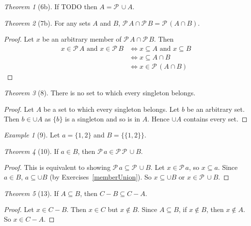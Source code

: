 \documentclass[12pt]{article}
\theoremstyle{plain}
\theoremstyle{remark}
\newtheorem*{exthm}{Theorem}
\newtheorem*{eg}{Example}
\theoremstyle{definition}
\theoremstyle{remark}
\newcommand{\powerset}{\mathscr{P}\,}
\renewcommand{\iff}{\Leftrightarrow}
\begin{document}
\begin{exthm}[6b]
 If TODO then $A = \powerset \cup A$.
\end{exthm}


\begin{exthm}[7b]
 For any sets $A$ and $B$, $\powerset A \cap \powerset B = \powerset (A \cap B)$.
\end{exthm}
\begin{proof}
 Let $x$ be an arbitrary member of $\powerset A \cap \powerset B$. Then
 \begin{align*}
  x \in \powerset A \text{ and } x \in \powerset B &\Leftrightarrow
  x \subseteq A \text { and } x \subseteq B\\
                                                   &\Leftrightarrow x \subseteq A \cap B\\
                                                   &\iff x \in \powerset (A \cap B)
 \end{align*}
\end{proof}

\begin{exthm}[8]
 There is no set to which every singleton belongs.
\end{exthm}
\begin{proof}
 Let $A$ be a set to which every singleton belongs. Let $b$ be an arbitrary set. Then $b \in \cup A$ as $\{b\}$ is a singleton and so is in $A$. Hence $\cup A$ contains every set.
\end{proof}

\begin{eg}[9]
 Let $a = \{1,2\}$ and $B = \{\{1,2\}\}$.
\end{eg}

\begin{exthm}[10]
 If $a \in B$, then $\powerset a \in \powerset \powerset \cup B$.
\end{exthm}

\begin{proof}
 This is equivalent to showing $\powerset a \subseteq \powerset \cup B$. Let $x \in \powerset a$, so $x \subseteq a$. Since $a \in B$, $a \subseteq \cup B$ (by Exercises~\ref{memberUnion}). So $x \subseteq \cup B$ or $x \in \powerset \cup B$.
\end{proof}

\begin{exthm}[13]
 If $A \subseteq B$, then $C - B \subseteq C - A$.
\end{exthm}
\begin{proof}
 Let $x \in C - B$. Then $x \in C$ but $x \not\in B$. Since $A \subseteq B$, if $x \not\in B$, then $x \not\in A$. So $x \in C - A$.
\end{proof}
\end{document}
